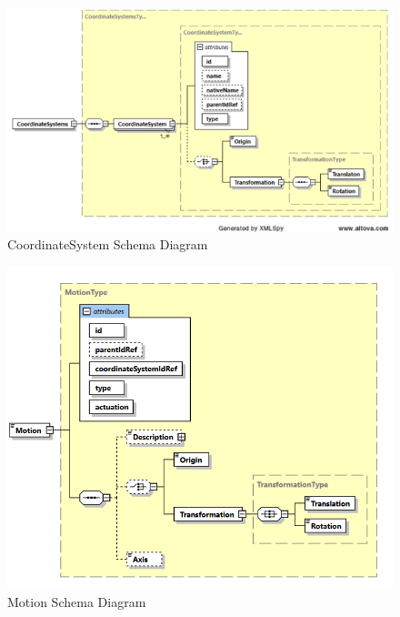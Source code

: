 \FloatBarrier


\begin{figure}[ht]
  \centering
    \includegraphics[width=1.0\textwidth]{figures/CoordinateSystem Schema.png}
  \caption{CoordinateSystem Schema Diagram}
  \label{fig:CoordinateSystem Schema Diagram}
\end{figure}

\FloatBarrier


\begin{figure}[ht]
  \centering
    \includegraphics[width=1.0\textwidth]{figures/Motion Schema.png}
  \caption{Motion Schema Diagram}
  \label{fig:Motion Schema Diagram}
\end{figure}

\FloatBarrier


